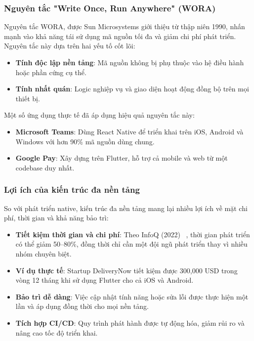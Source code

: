 \subsubsection{Nguyên tắc "Write Once, Run Anywhere" (WORA)}
\begin{flushleft}
    \hspace*{0.8cm}Nguyên tắc WORA, được Sun Microsystems giới thiệu từ thập niên 1990, nhấn mạnh vào khả năng tái sử dụng mã nguồn tối đa và giảm chi phí phát triển. Nguyên tắc này dựa trên hai yếu tố cốt lõi:
    \setlength{\leftmargini}{1.5cm}
    \begin{itemize}
        \item \textbf{Tính độc lập nền tảng}: Mã nguồn không bị phụ thuộc vào hệ điều hành hoặc phần cứng cụ thể.
        \item \textbf{Tính nhất quán}: Logic nghiệp vụ và giao diện hoạt động đồng bộ trên mọi thiết bị.
    \end{itemize}
\end{flushleft}

\begin{flushleft}
    \hspace*{0.8cm}Một số ứng dụng thực tế đã áp dụng hiệu quả nguyên tắc này:
    \setlength{\leftmargini}{1.5cm}
    \begin{itemize}
        \item \textbf{Microsoft Teams}: Dùng React Native để triển khai trên iOS, Android và Windows với hơn 90\% mã nguồn dùng chung.
        \item \textbf{Google Pay}: Xây dựng trên Flutter, hỗ trợ cả mobile và web từ một codebase duy nhất.
    \end{itemize}
\end{flushleft}

\subsubsection{Lợi ích của kiến trúc đa nền tảng}
\begin{flushleft}
    \hspace*{0.8cm}So với phát triển native, kiến trúc đa nền tảng mang lại nhiều lợi ích về mặt chi phí, thời gian và khả năng bảo trì:
    \setlength{\leftmargini}{1.5cm}
    \begin{itemize}
        \item \textbf{Tiết kiệm thời gian và chi phí}: Theo InfoQ (2022) ~\cite{infoq2022}, thời gian phát triển có thể giảm 50–80\%, đồng thời chỉ cần một đội ngũ phát triển thay vì nhiều nhóm chuyên biệt.
        \item \textbf{Ví dụ thực tế}: Startup DeliveryNow tiết kiệm được 300,000 USD trong vòng 12 tháng khi sử dụng Flutter cho cả iOS và Android.
        \item \textbf{Bảo trì dễ dàng}: Việc cập nhật tính năng hoặc sửa lỗi được thực hiện một lần và áp dụng đồng thời cho mọi nền tảng.
        \item \textbf{Tích hợp CI/CD}: Quy trình phát hành được tự động hóa, giảm rủi ro và nâng cao tốc độ triển khai.
    \end{itemize}
\end{flushleft}

